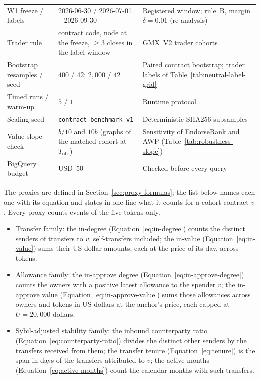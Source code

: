 \begin{table}[htbp]
{\begin{tabular}{lll}
W1 freeze / labels & 2026-06-30 / 2026-07-01 -- 2026-09-30 & Registered window; rule~B, margin $\delta=0.01$ (re-analysis) \\
Trader rule & contract code, node at the freeze, $\geq 3$ closes in the label window & GMX~V2 trader cohorts \\
Bootstrap resamples / seed & $400$ / $42$; $2{,}000$ / $42$ & Paired contract bootstrap; trader labels of Table~\ref{tab:neutral-label-grid} \\
Timed runs / warm-up & $5$ / $1$ & Runtime protocol \\
Scaling seed & \texttt{contract-benchmark-v1} & Deterministic SHA256 subsamples \\
Value-slope check & $b/10$ and $10b$ (graphs of the matched cohort at $T_{\mathrm{obs}}$) & Sensitivity of EndorseRank and AWP (Table~\ref{tab:robustness-slope}) \\
BigQuery budget & USD~50 & Checked before every query \\
\bottomrule
\end{tabular}
}
\end{table}


The proxies are defined in Section~\ref{sec:proxy-formulas}; the list below names each one with its equation and states in one line what it counts for a cohort contract $v$. Every proxy counts events of the five tokens only.

\begin{itemize}
\item Transfer family: the in-degree (Equation~\eqref{eq:in-degree}) counts the distinct senders of transfers to $v$, self-transfers included; the in-value (Equation~\eqref{eq:in-value}) sums their US-dollar amounts, each at the price of its day, across tokens.
\item Allowance family: the in-approve degree (Equation~\eqref{eq:in-approve-degree}) counts the owners with a positive latest allowance to the spender $v$; the in-approve value (Equation~\eqref{eq:in-approve-value}) sums those allowances across owners and tokens in US dollars at the anchor's price, each capped at $U=20{,}000$ dollars.
\item Sybil-adjusted stability family: the inbound counterparty ratio (Equation~\eqref{eq:counterparty-ratio}) divides the distinct other senders by the transfers received from them; the transfer tenure (Equation~\eqref{eq:tenure}) is the span in days of the transfers attributed to $v$; the active months (Equation~\eqref{eq:active-months}) count the calendar months with such transfers.
\end{itemize}

